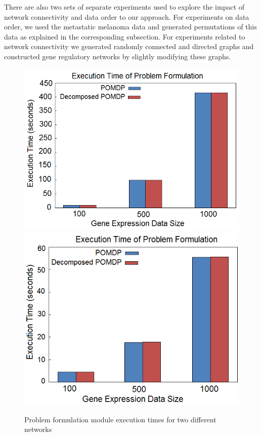 There are also two sets of separate experiments used to explore the impact of network connectivity and data order to our approach. For experiments on data order, we used the metastatic melanoma data and generated permutations of this data as explained in the corresponding subsection. For experiments related to network connectivity we generated randomly connected and directed graphs and constructed gene regulatory networks by slightly modifying these graphs.

\begin{figure}[h!]
\centering
\includegraphics[scale=0.5]{experiments/graph1.png}
\includegraphics[scale=0.5]{experiments/graph2.png} %
\caption{Problem formulation module
execution times for two different networks}\label{figure:formulationgraph}
\end{figure}

